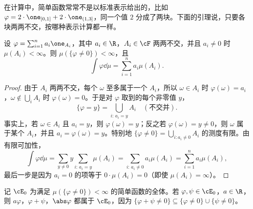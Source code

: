 在计算中，简单函数常常不是以标准表示给出的，比如 $\varphi=2\cdot\one_{[0,1]}+2\cdot\one_{(1,3]}$，同一个值 $2$ 分成了两块。下面的引理说，只要各块两两不交，按哪种表示计算都一样。

\begin{lemma}\label{lem:integration:representation}
设 $\varphi=\sum_{i=1}^na_i\one_{A_i}$，其中 $a_i\in\R$，$A_i\in\cF$ 两两不交，并且 $a_i\neq0$ 时 $\mu(A_i)<\infty$。则 $\mu(\{\varphi\neq0\})<\infty$，且
\[
\int\varphi\dd\mu=\sum_{i=1}^na_i\mu(A_i).
\]
\end{lemma}
\begin{proof}
由于 $A_i$ 两两不交，每个 $\omega$ 至多属于一个 $A_i$，所以 $\omega\in A_i$ 时 $\varphi(\omega)=a_i$，$\omega\notin\bigcup_iA_i$ 时 $\varphi(\omega)=0$。于是对 $\varphi$ 取到的每个非零值 $y$，
\[
\{\varphi=y\}=\bigcup_{i:\,a_i=y}A_i\quad(\text{不交并}).
\]
事实上，若 $\omega\in A_i$ 且 $a_i=y$，则 $\varphi(\omega)=y$；反之若 $\varphi(\omega)=y\neq0$，则 $\omega$ 属于某个 $A_i$，并且 $a_i=\varphi(\omega)=y$。特别地 $\{\varphi\neq0\}=\bigcup_{i:a_i\neq0}A_i$ 的测度有限。由有限可加性，
\[
\int\varphi\dd\mu=\sum_{y\neq0}y\sum_{i:\,a_i=y}\mu(A_i)=\sum_{i:\,a_i\neq0}a_i\mu(A_i)=\sum_{i=1}^na_i\mu(A_i),
\]
最后一步是因为 $a_i=0$ 的项等于 $0\cdot\mu(A_i)=0$（即使 $\mu(A_i)=\infty$）。
\end{proof}

记 $\cE_0$ 为满足 $\mu(\{\varphi\neq0\})<\infty$ 的简单函数的全体。若 $\varphi,\psi\in\cE_0$，$a\in\R$，则 $a\varphi$，$\varphi+\psi$，$\abs\varphi$ 都属于 $\cE_0$，因为 $\{\varphi+\psi\neq0\}\subseteq\{\varphi\neq0\}\cup\{\psi\neq0\}$。

